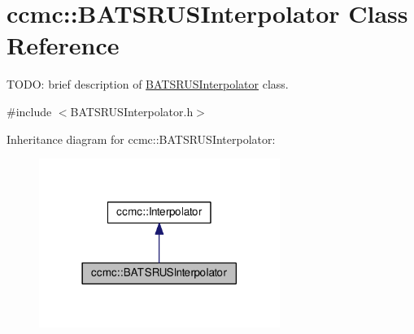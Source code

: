 \hypertarget{classccmc_1_1_b_a_t_s_r_u_s_interpolator}{\section{ccmc\-:\-:B\-A\-T\-S\-R\-U\-S\-Interpolator Class Reference}
\label{classccmc_1_1_b_a_t_s_r_u_s_interpolator}
}


T\-O\-D\-O\-: brief description of \hyperlink{classccmc_1_1_b_a_t_s_r_u_s_interpolator}{B\-A\-T\-S\-R\-U\-S\-Interpolator} class.  




{\ttfamily \#include $<$B\-A\-T\-S\-R\-U\-S\-Interpolator.\-h$>$}



Inheritance diagram for ccmc\-:\-:B\-A\-T\-S\-R\-U\-S\-Interpolator\-:
\nopagebreak
\begin{figure}[H]
\begin{center}
\leavevmode
\includegraphics[width=222pt]{classccmc_1_1_b_a_t_s_r_u_s_interpolator__inherit__graph}
\end{center}
\end{figure}


